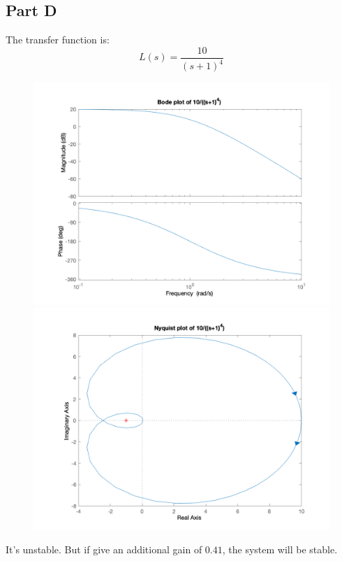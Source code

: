 \documentclass[a4paper]{article}
\begin{document}
\subsection{Part D} 
The transfer function is:
$$
L(s) = \frac{10}{(s+1)^4}
$$
\begin{figure}[H]
\centering
\begin{minipage}[t]{0.48\textwidth}
\centering
\includegraphics[width=\textwidth]{pic/7.png}
\end{minipage}
\begin{minipage}[t]{0.48\textwidth}
\centering
\includegraphics[width=\textwidth]{pic/8.png}
\end{minipage}
\end{figure}
It's unstable. But if give an additional gain of $0.41$, the system will be stable.
\end{document}
